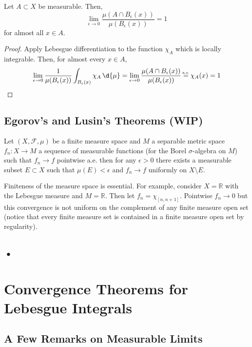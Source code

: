 \documentclass[12pt]{article}
\newcommand{\R}{\mathbb{R}}
\newcommand\eqae{\mathrel{\stackrel{\makebox[0pt]{\mbox{\normalfont\tiny a.e.}}}{=}}}
\renewcommand{\F}{\mathcal{F}}
\begin{document}
\begin{cor}
Let $A \subset X$ be measurable. Then,
\[ \lim_{\epsilon \to 0} \frac{\mu(A \cap B_\epsilon(x))}{\mu(B_\epsilon(x))} = 1 \]
for almost all $x \in A$.
\end{cor}

\begin{proof}
Apply Lebesgue differentiation to the function $\chi_A$ which is locally integrable. Then, for almost every $x \in A$,
\[ \lim_{\epsilon \to 0} \frac{1}{\mu(B_\epsilon(x))} \int_{B_\epsilon(x)} \chi_A \, \d{\mu} = \lim_{\epsilon \to 0} \frac{\mu(A \cap B_\epsilon(x))}{\mu(B_\epsilon(x))} \eqae \chi_A(x) = 1 \]
\end{proof}

\subsection{Egorov's and Lusin's Theorems (WIP)}

\begin{thm}[Egorov]
Let $(X, \F, \mu)$ be a finite measure space and $M$ a separable metric space $f_n : X \to M$ a sequence of measurable functions (for the Borel $\sigma$-algebra on $M$) such that $f_n \to f$ pointwise a.e. then for any $\epsilon > 0$ there exists a measurable subset $E \subset X$ such that $\mu(E) < \epsilon$ and $f_n \to f$ uniformly on $X \setminus E$.
\end{thm}

\begin{rmk}
Finiteness of the measure space is essential. For example, consider $X = \R$ with the Lebesgue measure and $M = \R$. Then let $f_n = \chi_{[n, n+1]}$. Pointwise $f_n \to 0$ but this convergence is not uniform on the complement of any finite measure open set (notice that every finite measure set is contained in a finite measure open set by regularity). 
\end{rmk}

\subsection{•}

\section{Convergence Theorems for Lebesgue Integrals}


\subsection{A Few Remarks on Measurable Limits}
\end{document}
